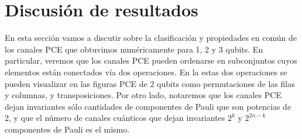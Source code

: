 \section{Discusión de resultados}\label{sec:ch3_discussion} %
En esta sección vamos a discutir sobre la clasificación y propiedades 
en común de los canales PCE que obtuvimos numéricamente para 1, 2 y 3 qubits.
En particular, veremos que 
los canales PCE pueden ordenarse en subconjuntos cuyos elementos 
están conectados vía dos operaciones. En la  
estas dos operaciones se pueden visualizar en las figuras PCE de 2 qubits 
como permutaciones de las filas y columnas, y transposiciones. Por otro lado, 
notaremos que los canales PCE dejan invariantes
sólo cantidades de componentes de Pauli que son potencias de 2, y que 
el número de canales cuánticos que dejan invariantes $2^k$ y $2^{2n-k}$ 
componentes de Pauli es el mismo. 

%
%


